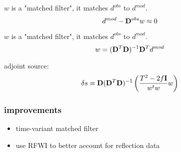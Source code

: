 \begin{frame}
  $w$ is a "matched filter", it matches $d^{obs}$ to $d^{mod}$.
      \[ d^{mod} - {\bf D}^{obs} w \approx 0\]
\end{frame}

\begin{frame}
  $w$ is a "matched filter", it matches $d^{obs}$ to $d^{mod}$.
      \[ w = ({\bf D}^T {\bf D})^{-1}{\bf D}^T d^{mod} \]
\end{frame}


\begin{frame}
  adjoint source:
  \[
  \delta s = {\bf D} ({\bf D}^T {\bf D})^{-1} \left( \frac{T^2 -2f {\bf I}}{w^tw} w\right)
  \]
\end{frame}



\begin{frame}
\end{frame}

\begin{frame}
\end{frame}

\begin{frame}
\end{frame}

\begin{frame}
\end{frame}


\begin{frame}
\end{frame}



\begin{frame}
\end{frame}

\begin{frame}
\end{frame}

\begin{frame} \frametitle{improvements}
\begin{itemize}
  \item time-variant matched filter
  \item use RFWI to better account for reflection data
\end{itemize}
\end{frame}
